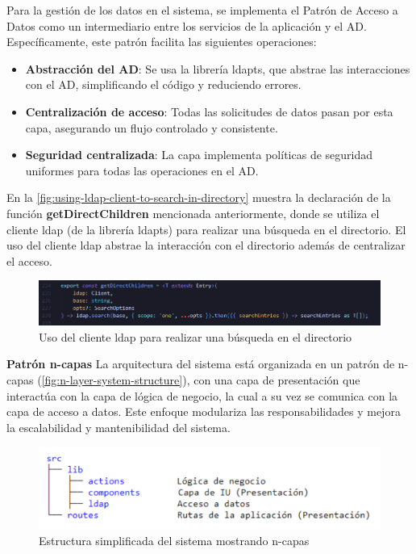Para la gestión de los datos en el sistema, se implementa el Patrón de Acceso a Datos como un intermediario entre los servicios de la aplicación y el AD. Específicamente, este patrón facilita las siguientes operaciones:
\begin{itemize}
    \item \textbf{Abstracción del AD}: Se usa la librería ldapts, que abstrae las interacciones con el AD, simplificando el código y reduciendo errores.
    \item \textbf{Centralización de acceso}: Todas las solicitudes de datos pasan por esta capa, asegurando un flujo controlado y consistente.
    \item \textbf{Seguridad centralizada}: La capa implementa políticas de seguridad uniformes para todas las operaciones en el AD.
\end{itemize}

En la \autoref{fig:using-ldap-client-to-search-in-directory} muestra la declaración de la función \textbf{getDirectChildren} mencionada anteriormente, donde se utiliza el cliente ldap (de la librería ldapts) para realizar una búsqueda en el directorio. El uso del cliente ldap abstrae la interacción con el directorio además de centralizar el acceso.

\begin{figure}[H]
    \centering
    \includegraphics[width=\linewidth]{images/code/getDirectChildren.png}
    \caption{Uso del cliente ldap para realizar una búsqueda en el directorio}
    \label{fig:using-ldap-client-to-search-in-directory}
\end{figure}

\textbf{Patrón n-capas}
La arquitectura del sistema está organizada en un patrón de n-capas (\autoref{fig:n-layer-system-structure}), con una capa de presentación que interactúa con la capa de lógica de negocio, la cual a su vez se comunica con la capa de acceso a datos. Este enfoque modulariza las responsabilidades y mejora la escalabilidad y mantenibilidad del sistema.

\begin{figure}[H]
    \centering
    \includegraphics[width=\linewidth]{images/app-folder-structure.png}
    \caption{Estructura simplificada del sistema mostrando n-capas}
    \label{fig:n-layer-system-structure}
\end{figure}